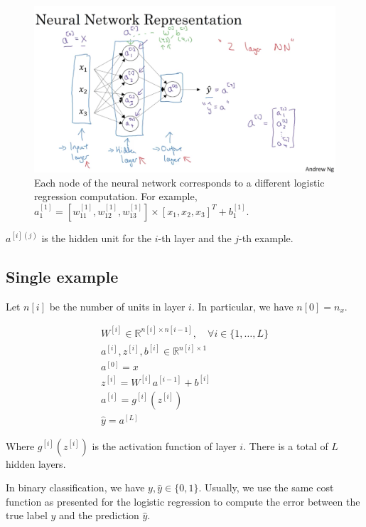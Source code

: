\begin{figure}
	\includegraphics[scale=0.3]{neural_network_representation.png}
	\caption{
		Each node of the neural network corresponds to a different logistic regression computation.
		For example, $a_1^{[1]} = [w_{11}^{[1]}, w_{12}^{[1]}, w_{13}^{[1]}] \times [x_1, x_2, x_3]^T + b_1^{[1]}$.
	}
\end{figure}

$a^{[i](j)}$ is the hidden unit for the $i$-th layer and the $j$-th example.

\subsection{Single example}
	Let $n[i]$ be the number of units in layer $i$.
	In particular, we have $n[0] = n_x$.
	
	\begin{align}
		W^{[i]}\in\mathbb{R}^{n[i]\times n[i-1]}, \quad \forall i\in\{1,\dots,L\} \\
		a^{[i]}, z^{[i]}, b^{[i]} \in \mathbb{R}^{n[i]\times 1} \\
		a^{[0]} = x \\
		z^{[i]} = W^{[i]} a^{[i-1]} + b^{[i]} \\
		a^{[i]} = g^{[i]}(z^{[i]}) \\ 
		\hat{y} = a^{[L]} 
	\end{align}
	
	Where $g^{[i]}(z^{[i]})$ is the activation function of layer $i$.
	There is a total of $L$ hidden layers.
	
	In binary classification, we have $y,\hat{y}\in\{0,1\}$.
	Usually, we use the same cost function as presented for the logistic regression to compute the error
	between the true label $y$ and the prediction $\hat{y}$.

